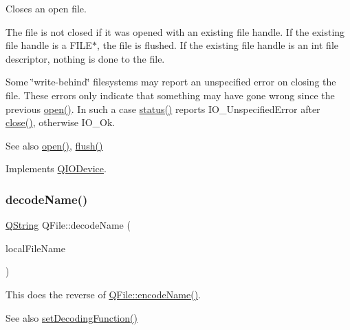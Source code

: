 Closes an open file.

The file is not closed if it was opened with an existing file handle. If the existing file handle is a {\ttfamily F\+I\+L\+E$\ast$}, the file is flushed. If the existing file handle is an {\ttfamily int} file descriptor, nothing is done to the file.

Some \char`\"{}write-\/behind\char`\"{} filesystems may report an unspecified error on closing the file. These errors only indicate that something may have gone wrong since the previous \mbox{\hyperlink{class_q_file_af10aeafc303904f98b74be9752d2aa43}{open()}}. In such a case \mbox{\hyperlink{class_q_i_o_device_aa9079e73ab2403922c528523cdf2d4ef}{status()}} reports I\+O\+\_\+\+Unspecified\+Error after \mbox{\hyperlink{class_q_file_ac0d8375a5ea7d4503545d7c68dcf58e1}{close()}}, otherwise I\+O\+\_\+\+Ok.

\begin{DoxySeeAlso}{See also}
\mbox{\hyperlink{class_q_file_af10aeafc303904f98b74be9752d2aa43}{open()}}, \mbox{\hyperlink{class_q_file_a6d450a55bc3a8145fd33a7ee08051830}{flush()}} 
\end{DoxySeeAlso}


Implements \mbox{\hyperlink{class_q_i_o_device_a01a9ddac5d964b5b6a1f10005bf28a4f}{Q\+I\+O\+Device}}.

\mbox{\label{class_q_file_ad9bf876589a366445a443cb8c7ef4df4}} 
\subsubsection{\texorpdfstring{decodeName()}{decodeName()}}
{\footnotesize\ttfamily \mbox{\hyperlink{class_q_string}{Q\+String}} Q\+File\+::decode\+Name (\begin{DoxyParamCaption}\item[{const \mbox{\hyperlink{class_q_c_string}{Q\+C\+String}} \&}]{local\+File\+Name }\end{DoxyParamCaption})\hspace{0.3cm}{\ttfamily [static]}}

This does the reverse of \mbox{\hyperlink{class_q_file_ad016ade1aca4b965ebb54d8bfb93d4bf}{Q\+File\+::encode\+Name()}}.

\begin{DoxySeeAlso}{See also}
\mbox{\hyperlink{class_q_file_aa71ab03f9a14cc35fe1e70dd9a392806}{set\+Decoding\+Function()}} 
\end{DoxySeeAlso}
\mbox{\label{class_q_file_ad016ade1aca4b965ebb54d8bfb93d4bf}} 
